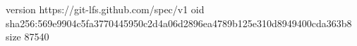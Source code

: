 version https://git-lfs.github.com/spec/v1
oid sha256:569e9904c5fa3770445950c2d4a06d2896ea4789b125e310d8949400cda363b8
size 87540
